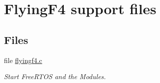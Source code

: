 \hypertarget{group___flying_f4}{\section{\-Flying\-F4 support files}
\label{group___flying_f4}
}
\subsection*{\-Files}
\begin{DoxyCompactItemize}
\item 
file \hyperlink{flyingf4_8c}{flyingf4.\-c}
\begin{DoxyCompactList}\small\item\em \-Start \-Free\-R\-T\-O\-S and the \-Modules. \end{DoxyCompactList}\end{DoxyCompactItemize}
